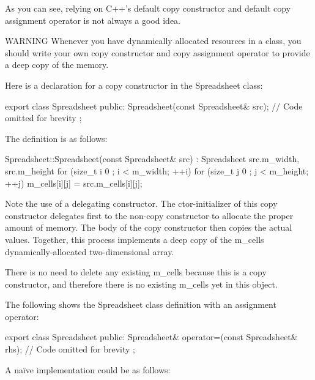 As you can see, relying on C++’s default copy constructor and default copy assignment operator is not always a good idea.

\begin{myWarning}{WARNING}
Whenever you have dynamically allocated resources in a class, you should write your own copy constructor and copy assignment operator to provide a deep copy of the memory.
\end{myWarning}


Here is a declaration for a copy constructor in the Spreadsheet class:

\begin{cpp}
export class Spreadsheet
{
    public:
        Spreadsheet(const Spreadsheet& src);
        // Code omitted for brevity
};
\end{cpp}

The definition is as follows:

\begin{cpp}
Spreadsheet::Spreadsheet(const Spreadsheet& src)
    : Spreadsheet { src.m_width, src.m_height }
{
    for (size_t i { 0 }; i < m_width; ++i) {
        for (size_t j { 0 }; j < m_height; ++j) {
            m_cells[i][j] = src.m_cells[i][j];
        }
    }
}
\end{cpp}

Note the use of a delegating constructor. The ctor-initializer of this copy constructor delegates first to the non-copy constructor to allocate the proper amount of memory. The body of the copy constructor then copies the actual values. Together, this process implements a deep copy of the m\_cells dynamically-allocated two-dimensional array.

There is no need to delete any existing m\_cells because this is a copy constructor, and therefore there is no existing m\_cells yet in this object.


The following shows the Spreadsheet class definition with an assignment operator:

\begin{cpp}
export class Spreadsheet
{
    public:
        Spreadsheet& operator=(const Spreadsheet& rhs);
        // Code omitted for brevity
};
\end{cpp}

A naïve implementation could be as follows:


